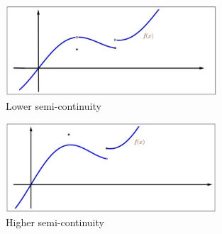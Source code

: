\documentclass[a4pper,11pt]{article}
\begin{document}
\begin{figure}[H] %
\centering %
\includegraphics[width=0.7\textwidth]{figs/lowersemi.png} %
\caption{Lower semi-continuity} %
\label{Fig.main2} %
\end{figure}
\begin{figure}[H] %
\centering %
\includegraphics[width=0.7\textwidth]{figs/highersemi.png} %
\caption{Higher semi-continuity} %
\label{Fig.main2} %
\end{figure}


\end{document}
